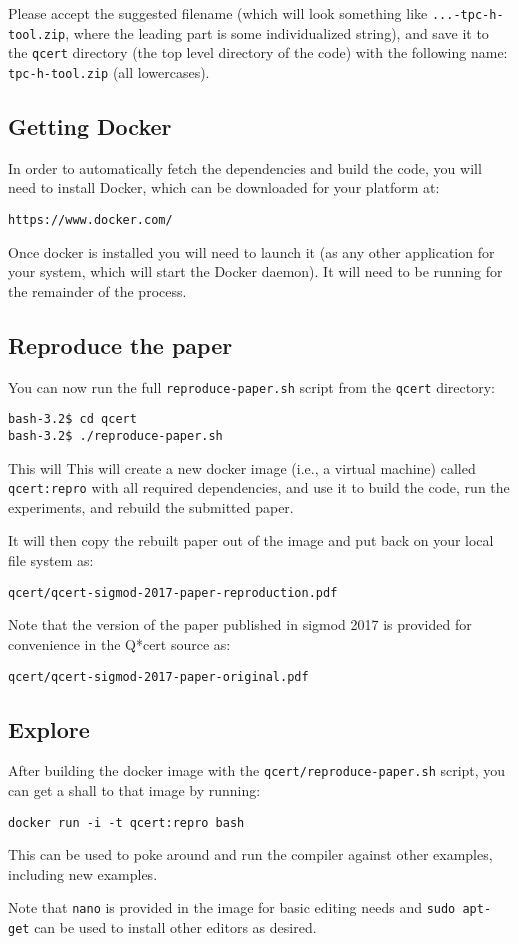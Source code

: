 \documentclass[acmsmall]{acmart}
\begin{document}
Please accept the suggested filename (which will look something like
\verb+...-tpc-h-tool.zip+, where the leading part is some
individualized string), and save it to the \verb+qcert+ directory (the
top level directory of the code) with the following name:
\verb+tpc-h-tool.zip+ (all lowercases).

\subsection*{Getting Docker}

In order to automatically fetch the dependencies and build the code,
you will need to install Docker, which can be downloaded for your platform at:
\begin{verbatim}
https://www.docker.com/
\end{verbatim}

Once docker is installed you will need to launch it (as any other
application for your system, which will start the Docker daemon). It
will need to be running for the remainder of the process.

\subsection*{Reproduce the paper}

You can now run the full \verb+reproduce-paper.sh+ script from the
\verb+qcert+ directory:
\begin{verbatim}
bash-3.2$ cd qcert
bash-3.2$ ./reproduce-paper.sh 
\end{verbatim}

This will This will create a new docker image (i.e., a virtual
machine) called \verb+qcert:repro+ with all required dependencies, and
use it to build the code, run the experiments, and rebuild the
submitted paper.

It will then copy the rebuilt paper out of the image and put back on
your local file system as:
\begin{verbatim}
qcert/qcert-sigmod-2017-paper-reproduction.pdf
\end{verbatim}

Note that the version of the paper published in sigmod 2017 is
provided for convenience in the Q*cert source as:
\begin{verbatim}
qcert/qcert-sigmod-2017-paper-original.pdf
\end{verbatim}

\subsection*{Explore}

After building the docker image with the
\verb+qcert/reproduce-paper.sh+ script, you can get a shall to that image by running:

\begin{verbatim}
docker run -i -t qcert:repro bash
\end{verbatim}

This can be used to poke around and run the compiler against other
examples, including new examples.

Note that \verb+nano+ is provided in the image for basic editing needs
and \verb+sudo apt-get+ can be used to install other editors as
desired.
\end{document}

